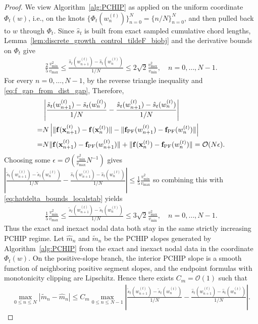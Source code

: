 \documentclass{article}
\newcommand{\Oc}{\mathcal{O}}
\newcommand{\bx}{\mathbf{x}}
\newcommand{\f}{\mathbf{f}}
\newcommand{\fPF}{{\mathbf{f}_{\rm PF}}}
\newcommand{\Farc}{\Phi}
\begin{document}
\begin{proof}
We view Algorithm~\ref{alg:PCHIP} as applied on the uniform coordinate $\Farc_t(w)$, i.e., on the knots $\{\Farc_t(w_n^{(t)})\}_{n=0}^N=\{n/N\}_{n=0}^N$, and then pulled back to $w$ through $\Farc_t$. Since $\hat s_t$ is built from exact sampled cumulative chord lengths, Lemma~\ref{lem:discrete_growth_control_tildeF_biobj} and the derivative bounds on $\Farc_t$ give
\begin{align}
\frac{2}{5}\frac{v_{\min}^2}{v_{\max}} \le \frac{\hat s_t(w_{n+1}^{(t)})-\hat s_t(w_n^{(t)})}{1/N} \le 2\sqrt2\frac{v_{\max}^2}{v_{\min}}, \quad n=0,\dots,N-1.
\label{eq:hatdelta_bounds_localstab}
\end{align}
For every $n=0,\dots,N-1$, by the reverse triangle inequality and \eqref{eq:f_gap_from_dist_gap},
Therefore,
\begin{align}
&\left|\frac{\tilde s_t(w_{n+1}^{(t)})-\tilde s_t(w_n^{(t)})}{1/N}-\frac{\hat s_t(w_{n+1}^{(t)})-\hat s_t(w_n^{(t)})}{1/N}\right| \nonumber \\
= & N\left| \|\f(\bx_{n+1}^{(t)})-\f(\bx_n^{(t)})\|-\|\fPF(w_{n+1}^{(t)})-\fPF(w_n^{(t)})\| \right| \nonumber \\
=& N \|\f(\bx_{n+1}^{(t)})-\fPF(w_{n+1}^{(t)})\|+\|\f(\bx_n^{(t)})-\fPF(w_n^{(t)})\| = \Oc(N\epsilon).
\label{eq:delta_gap_direct}
\end{align}
Choosing some $\epsilon=\Oc\left(\frac{v_{\min}^2}{v_{\max}}N^{-1}\right)$ gives
$\left|\frac{\tilde s_t(w_{n+1}^{(t)})-\tilde s_t(w_n^{(t)})}{1/N}-\frac{\hat s_t(w_{n+1}^{(t)})-\hat s_t(w_n^{(t)})}{1/N}\right| \le \frac15\frac{v_{\min}^2}{v_{\max}}$
so combining this with \eqref{eq:hatdelta_bounds_localstab} yields
\begin{align}
\frac{1}{5}\frac{v_{\min}^2}{v_{\max}} \le \frac{\tilde s_t(w_{n+1}^{(t)})-\tilde s_t(w_n^{(t)})}{1/N} \le 3\sqrt2\frac{v_{\max}^2}{v_{\min}}, \quad n=0,\dots,N-1.
\label{eq:tildedelta_bounds_localstab}
\end{align}
Thus the exact and inexact nodal data both stay in the same strictly increasing PCHIP regime. Let $\hat m_n$ and $\tilde m_n$ be the PCHIP slopes generated by Algorithm~\ref{alg:PCHIP} from the exact and inexact nodal data in the coordinate $\Farc_t(w)$. On the positive-slope branch, the interior PCHIP slope is a smooth function of neighboring positive segment slopes, and the endpoint formulas with monotonicity clipping are Lipschitz. Hence there exists $C_m=\Oc(1)$ such that
\begin{align}
\max_{0\le n\le N}|\tilde m_n-\hat m_n| \le C_m\max_{0\le n\le N-1}\left|\frac{\tilde s_t(w_{n+1}^{(t)})-\tilde s_t(w_n^{(t)})}{1/N}-\frac{\hat s_t(w_{n+1}^{(t)})-\hat s_t(w_n^{(t)})}{1/N}\right|.
\label{eq:pchip_slope_stability_local}
\end{align}


\end{proof}
\end{document}
